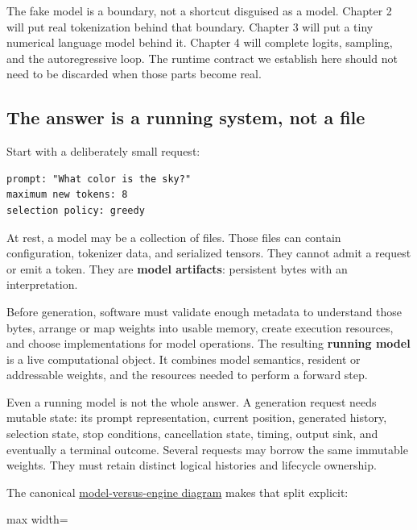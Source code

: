 \documentclass[
  10pt,
]{article}
\begin{document}
The fake model is a boundary, not a shortcut disguised as a model.
Chapter 2 will put real tokenization behind that boundary. Chapter 3
will put a tiny numerical language model behind it. Chapter 4 will
complete logits, sampling, and the autoregressive loop. The runtime
contract we establish here should not need to be discarded when those
parts become real.

\subsection{The answer is a running system, not a
file}\label{the-answer-is-a-running-system-not-a-file}

Start with a deliberately small request:

\begin{verbatim}
prompt: "What color is the sky?"
maximum new tokens: 8
selection policy: greedy
\end{verbatim}

At rest, a model may be a collection of files. Those files can contain
configuration, tokenizer data, and serialized tensors. They cannot admit
a request or emit a token. They are \textbf{model artifacts}: persistent
bytes with an interpretation.

Before generation, software must validate enough metadata to understand
those bytes, arrange or map weights into usable memory, create execution
resources, and choose implementations for model operations. The
resulting \textbf{running model} is a live computational object. It
combines model semantics, resident or addressable weights, and the
resources needed to perform a forward step.

Even a running model is not the whole answer. A generation request needs
mutable state: its prompt representation, current position, generated
history, selection state, stop conditions, cancellation state, timing,
output sink, and eventually a terminal outcome. Several requests may
borrow the same immutable weights. They must retain distinct logical
histories and lifecycle ownership.

The canonical
\href{https://github.com/hermonai/inside-the-llm-engine/blob/astra-visual-rewrite/diagrams/runtime/model-vs-engine.txt}{model-versus-engine
diagram} makes that split explicit:

\begin{center}\begin{adjustbox}{max width=\linewidth}\end{adjustbox}\end{center}
\end{document}
